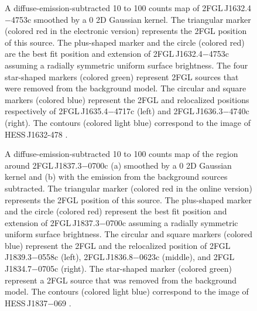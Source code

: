 \documentclass[12pt,preprint]{aastex}
\newif\ifcolorfigure
\newcommand{\gev}{\text{GeV}\xspace}
\newcommand{\tev}{\text{TeV}\xspace}
\begin{document}
\begin{figure}
    \ifcolorfigure
      \plotone{source_plots/source_HESS_J1632-478_color.eps}
    \else
    \fi
  \caption{A diffuse-emission-subtracted 10 \gev to 100 \gev counts map of
  2FGL\,J1632.4$-$4753c smoothed by a 0 2D Gaussian
  kernel.  The triangular marker (colored red in the electronic version)
  represents the 2FGL position of this source.  The plus-shaped marker
  and the circle (colored red) are the best fit position and extension of
  2FGL\,J1632.4$-$4753c assuming a radially symmetric uniform surface
  brightness.  The four star-shaped markers (colored green) represent 2FGL
  sources that were removed from the background model.  The circular
  and square markers (colored blue) represent the 2FGL and relocalized
  positions respectively of 2FGL\,J1635.4$-$4717c (left)
  and 2FGL\,J1636.3$-$4740c (right).  
  The contours (colored light blue) correspond to the \tev image of
  HESS\,J1632-478 \citep{hess_plane_survey}.
  }\label{1FGL_J1632.9-4802c}
\end{figure}


\begin{figure}
    \ifcolorfigure
      \plotone{source_plots/source_HESS_J1837-069_color.eps}
    \else
    \fi
  \caption{
  A diffuse-emission-subtracted 10 \gev to 100 \gev counts map of the
  region around 2FGL\,J1837.3$-$0700c (a) smoothed by a 0 2D Gaussian
  kernel and (b) with the emission from the background sources subtracted.
  The triangular marker (colored red in the online version) represents
  the 2FGL
  position of this source. The plus-shaped marker and 
  the circle (colored red) represent
  the best fit position and extension of 2FGL\,J1837.3$-$0700c assuming a
  radially symmetric uniform surface brightness. The circular
  and square markers 
  (colored blue) represent the 2FGL and the relocalized position of
  2FGL\,J1839.3$-$0558c (left), 2FGL\,J1836.8$-$0623c (middle),
  and 2FGL\,J1834.7$-$0705c (right).  The star-shaped marker 
  (colored green) represent a
  2FGL source that was removed from the background model.  
  The contours (colored light blue) correspond to the \tev image of
  HESS\,J1837$-$069
  \citep{hess_plane_survey}.}\label{1FGL_J1837.5-0659c}
\end{figure}
\end{document}

